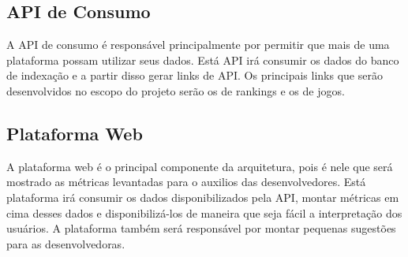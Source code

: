 \subsection{API de Consumo}
A API de consumo é responsável principalmente por permitir que mais de uma plataforma possam utilizar seus dados. Está API irá consumir os dados do banco de indexação e a partir disso gerar links de API. Os principais links que serão desenvolvidos no escopo do projeto serão os de rankings e os de jogos.
\subsection{Plataforma Web}
A plataforma web é o principal componente da arquitetura, pois é nele que será mostrado as métricas levantadas para o auxilios das desenvolvedores. Está plataforma irá consumir os dados disponibilizados pela API, montar métricas em cima desses dados e disponibilizá-los de maneira que seja fácil a interpretação dos usuários. A plataforma também será responsável por montar pequenas sugestões para as desenvolvedoras.

